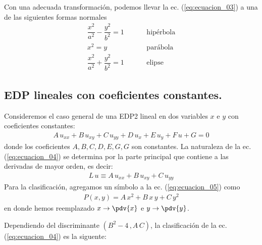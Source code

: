\par
\begin{center}
\end{center}
Con una adecuada transformación, podemos llevar la ec. (\ref{eq:ecuacion_03}) a una de las siguientes formas normales
\begin{align*}
\dfrac{x^{2}}{a^{2}} - \dfrac{y^{2}}{b^{2}} =  1 \hspace{1cm} &\text{hipérbola} \\[1em]
x^{2} = y \hspace{1cm} &\text{parábola} \\[1em]
\dfrac{x^{2}}{a^{2}} + \dfrac{y^{2}}{b^{2}} =  1 \hspace{1cm} &\text{elipse}
\end{align*}
\subsection{EDP lineales con coeficientes constantes.}
Consideremos el caso general de una EDP2 lineal en dos variables $x$ e $y$ con coeficientes constantes:
\begin{align}
A \, u_{xx} + B \, u_{xy} + C \, u_{yy} + D \, u_{x} + E \, u_{y} + F \, u + G = 0
\label{eq:ecuacion_04}    
\end{align}
donde los coeficientes $A, B, C, D, E, G, G$ son constantes. La naturaleza de la ec. (\ref{eq:ecuacion_04}) se determina por la parte principal que contiene a las derivadas de mayor orden, es decir:
\begin{align}
L \, u \equiv A \, u_{xx} + B \, u_{xy} + C \, u_{yy}
\label{eq:ecuacion_05}    
\end{align}
Para la clasificación, agregamos un símbolo a la ec. (\ref{eq:ecuacion_05}) como
\begin{align*}
P(x, y) = A \, x^{2} + B \, x \, y + C \, y^{2}
\end{align*}
en donde hemos reemplazado $x \to \displaystyle \pdv{x}$ e $y \to \displaystyle \pdv{y}$.
\par
Dependiendo del discriminante $(B^{2} - 4\, , A \, C)$, la clasificación de la ec. (\ref{eq:ecuacion_04}) es la siguente:
\begin{center}
\end{center}
